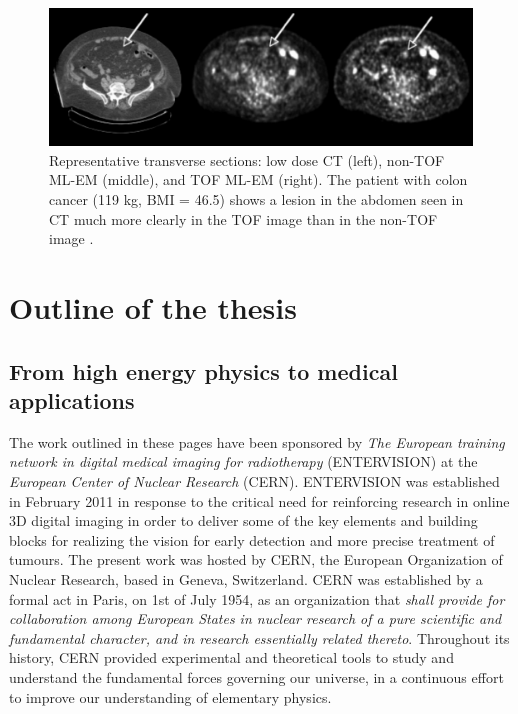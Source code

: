 \begin{figure}  
\centering
\includegraphics[width=14cm]{Pictures/Chapter_1/tof_gain.pdf}
\caption[Improvement of TOF-PET]{Representative transverse sections: low dose CT (left), non-TOF ML-EM (middle), and TOF ML-EM (right). The patient with colon cancer (119 kg, BMI = 46.5) shows a lesion in the abdomen seen in CT much more clearly in the TOF image than in the non-TOF image \cite{Karp2008}.}
\label{fig:tofgain}
\end{figure}

\section{Outline of the thesis}

\subsection{From high energy physics to medical applications}
The work outlined in these pages have been sponsored by \textit{The European training network in digital medical imaging for radiotherapy} (ENTERVISION) at the \textit{European Center of Nuclear Research} (CERN). ENTERVISION was established in February 2011 in response to the critical need for reinforcing research in online 3D digital imaging in order to deliver some of the key elements and building blocks for realizing the vision for early detection and more precise treatment of tumours.
The present work was hosted by CERN, the European Organization of Nuclear Research, based in Geneva, Switzerland. 
CERN was established by a formal act in Paris, on 1st of July 1954, as an organization that \textit{shall provide for collaboration among European States in nuclear research of a pure scientific and fundamental character, and in research essentially related thereto}.
Throughout its history, CERN provided experimental and theoretical tools to study and understand the fundamental forces governing our universe, in a continuous effort to improve our understanding of elementary  physics. 

